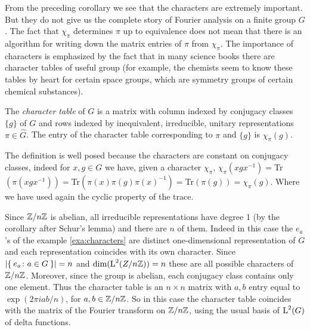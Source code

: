 From the preceding corollary we see that the characters are extremely important. But they do not give us the complete  story  of Fourier  analysis on a finite
group $G$. The fact that $\chi_\pi$ determines $\pi$ up to equivalence does not mean that there is an algorithm for writing down the matrix entries  of $\pi$ from $\chi_\pi$.
The importance of characters is emphasized by the fact that in many science books there are character tables of useful group (for example, the  chemists  seem  to  know  these  tables  by heart for certain space groups, which are symmetry groups of certain chemical substances).

\begin{defn}
The \emph{character table} of $G$ is a matrix with column indexed by conjugacy classes $\{g\}$ of $G$ and rows indexed by inequivalent, irreducible, unitary representations $\pi \in \hat{G}$. The entry of   the character table corresponding to $\pi$ and $\{g\}$ is $\chi_\pi(g)$.
\end{defn}
\begin{rem}
The definition is well posed because the characters are constant on conjugacy classes, indeed for $x,g\in G$ we have, given a character $\chi_\pi$, $\chi_\pi(xgx^{-1})=$Tr$(\pi(xgx^{-1}))=$Tr$(\pi(x)\pi(g)\pi(x)^{-1})=$Tr$(\pi(g))=\chi_\pi(g)$.
Where we have used again the cyclic property of the trace.
\end{rem}
\begin{exmp}[$\Z/{n\Z}$]
Since $\Z/{n\Z}$ is abelian, all irreducible representations  have  degree  1 (by the corollary after Schur's lemma)  and  there  are $n$ of them. Indeed in this case  the $e_a$'s of the example \ref{exa:characters}  are  distinct one-dimensional representation of $G$ and each representation coincides with its own character. Since $\lvert\Set{e_a\colon a \in G}\rvert= n $ and $\dim(\operatorname{L}^{2}(Z/{n{\mathbb Z}}))=n$ these are all possible characters of $\Z/{n\Z}$. Moreover, since the group is abelian, each conjugacy class contains only one element. Thus the character table is an $n\times n$ matrix with $a,b$ entry equal to  $\exp(2\pi iab/n)$, for $a,b \in {\mathbb Z}/{n{\mathbb Z}}$. So in this case the character table coincides with the matrix of the Fourier transform on  $\Z/{n\Z}$, using the usual basis of $\operatorname{L}^{2}(G)$ of delta functions.	
\end{exmp}

